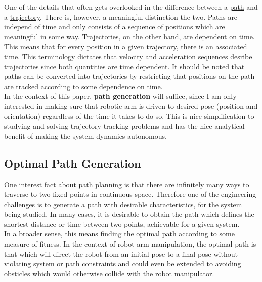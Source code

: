 \documentclass[journal]{IEEEtran}
\begin{document}
One of the details that often gets overlooked in the difference between a \underline{path} and a \underline{trajectory}. There is, however, a meaningful distinction the two. Paths are independ of time and only consists of a sequence of positions which are meaningful in some way. Trajectories, on the other hand, are dependent on time. This means that for every position in a given trajectory, there is an associated time. This terminology dictates that velocity and acceleration sequences desribe trajectories since both quantities are time dependent. It should be noted that paths can be converted into trajectories by restricting that positions on the path are tracked according to some dependence on time. \\

In the context of this paper, \textbf{path generation} will suffice, since I am only interested in making sure that robotic arm is driven to desired pose (position and orientation) regardless of the time it takes to do so. This is nice simplification to studying and solving trajectory tracking problems and has the nice analytical benefit of making the system dynamics autonomous.

\subsection{Optimal Path Generation}

One interest fact about path planning is that there are infinitely many ways to traverse to two fixed points in continuous space. Therefore one of the engineering challenges is to generate a path with desirable characteristics, for the system being studied. In many cases, it is desirable to obtain the path which defines the shortest distance or time between two points, achievable for a given system. \\

In a broader sense, this means finding the \underline{optimal path} according to some measure of fitness. In the context of robot arm manipulation, the optimal path is that which will direct the robot from an initial pose to a final pose without violating system or path constraints and could even be extended to avoiding obsticles which would otherwise collide with the robot manipulator. \\
\end{document}
